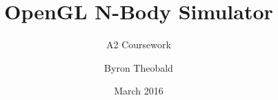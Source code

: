 \begin{titlepage}

\subject{Computing}

\title{OpenGL N-Body Simulator}

\subtitle{A2 Coursework}

\author{Byron Theobald}
\date{March 2016}

\publishers{Northgate Sixth Form}

\maketitle

\end{titlepage}